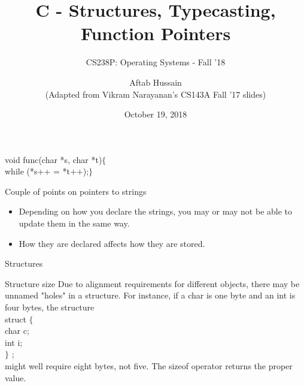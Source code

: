 \documentclass[10pt]{beamer}
\title{C - Structures, Typecasting, Function Pointers}
\subtitle{CS238P: Operating Systems - Fall '18}
\date{October 19, 2018}
\author{Aftab Hussain \\ (Adapted from Vikram Narayanan's CS143A Fall '17 slides)}
\institute{University of California, Irvine}
\begin{document}
\maketitle


\begin{frame}[standout]
void func(char *s, char *t)$\{$ \\
while (*s++ = *t++);$\}$
\end{frame}

\begin{frame}{Couple of points on pointers to strings}
  \begin{itemize}
  \item<1-> Depending on how you declare the strings, you may or may not be able to update them in the same way.
  \item<2-> How they are declared affects how they are stored.
  \end{itemize}
  \end{frame}

  \begin{frame}[standout]
    Structures
  \end{frame}

  \begin{frame}{Structure size}
    Due to alignment requirements for different objects, there
    may be unnamed "holes" in a structure. For instance, if a char is one
    byte and an int is four bytes, the structure\\
    struct $\{$\\
    char c;\\
    int i;\\
    $\}$ ;\\
    might well require eight bytes, not five. The sizeof operator returns the
    proper value.
    \end{frame}




\end{document}
